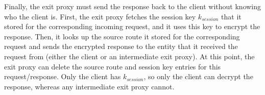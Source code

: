 Finally, the exit proxy must send the response back to the client without
knowing who the client is.  First, the exit proxy fetches the session key $k_{session}$
that it stored for the corresponding incoming request, and it uses this key to encrypt the response.  Then, it looks up the source route it stored for the corresponding request 
and sends the encrypted response to the entity that it received the request from (either the client or an intermediate exit proxy).  At this point, the exit proxy can delete the source route and session key entries 
for this request/response.  Only the client has $k_{session}$, so only the client can decrypt the response, whereas any intermediate exit proxy cannot.  



